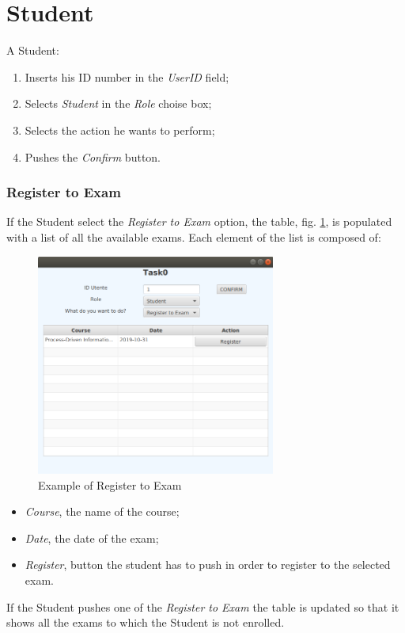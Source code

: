 \documentclass{report}
\begin{document}
\section*{Student}
A Student:
\begin{enumerate}
	\item Inserts his ID number in the \textit{UserID} field;
	\item Selects \textsl{Student} in the \textit{Role} choise box;
	\item Selects the action he wants to perform;
	\item Pushes the \textit{Confirm} button.
\end{enumerate}
\subsubsection*{Register to Exam}
If the Student select the \textit{Register to Exam} option, the table, fig. \ref{fig:RegisterToExam}, is populated with a list of all the available exams. Each element of the list is composed of:
\begin{figure} [h!]
	\centering
	\includegraphics[width=0.7\textwidth]{RegisterToExam.png}
	\caption{Example of Register to Exam}
	\label{fig:RegisterToExam}
\end{figure}
\begin{itemize}
	\item \textit{Course}, the name of the course;
	\item \textit{Date}, the date of the exam;
	\item \textit{Register}, button the student has to push in order to register to the selected exam. 
\end{itemize}
If the Student pushes one of the \textit{Register to Exam} the table is updated so that it shows all the exams to which the Student is not enrolled.
\end{document}
